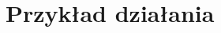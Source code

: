 \documentclass[12pt,a4paper]{article}
\begin{document}
\section{Przykład działania}

\end{document}
